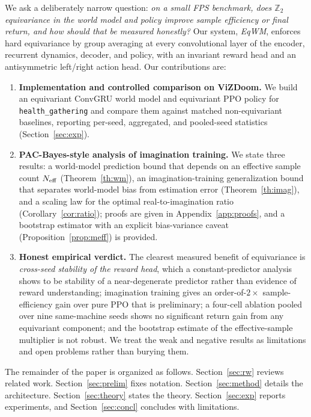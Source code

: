 \documentclass[preprint,12pt]{elsarticle}
\begin{document}
We ask a deliberately narrow question: \emph{on a small FPS benchmark, does
$\mathbb Z_2$ equivariance in the world model and policy improve sample
efficiency or final return, and how should that be measured honestly?} Our
system, \emph{EqWM}, enforces hard equivariance by group averaging
\cite{gcnn2016} at every convolutional layer of the encoder, recurrent
dynamics, decoder, and policy, with an invariant reward head and an
antisymmetric left/right action head. Our contributions are:
\begin{enumerate}[leftmargin=*]
  \item \textbf{Implementation and controlled comparison on ViZDoom.} We
        build an equivariant ConvGRU world model and equivariant PPO policy
        for \texttt{health\_gathering} and compare them against matched
        non-equivariant baselines, reporting per-seed, aggregated, and
        pooled-seed statistics (Section~\ref{sec:exp}).
  \item \textbf{PAC-Bayes-style analysis of imagination training.} We state
        three results: a world-model prediction bound that depends on an
        effective sample count $N_{\rm eff}$ (Theorem~\ref{th:wm}), an
        imagination-training generalization bound that separates world-model
        bias from estimation error (Theorem~\ref{th:imag}), and a scaling law
        for the optimal real-to-imagination ratio
        (Corollary~\ref{cor:ratio}); proofs are given in
        Appendix~\ref{app:proofs}, and a bootstrap estimator with an explicit
        bias-variance caveat (Proposition~\ref{prop:meff}) is provided.
  \item \textbf{Honest empirical verdict.} The clearest measured benefit of
        equivariance is \emph{cross-seed stability of the reward head}, which
        a constant-predictor analysis shows to be stability of a
        near-degenerate predictor rather than evidence of reward
        understanding; imagination training gives an order-of-$2\times$
        sample-efficiency gain over pure PPO that is preliminary; a four-cell
        ablation pooled over nine same-machine seeds shows no significant
        return gain from any equivariant component; and the bootstrap estimate
        of the effective-sample multiplier is not robust. We treat the weak
        and negative results as limitations and open problems rather than
        burying them.
\end{enumerate}

The remainder of the paper is organized as follows. Section~\ref{sec:rw}
reviews related work. Section~\ref{sec:prelim} fixes notation.
Section~\ref{sec:method} details the architecture. Section~\ref{sec:theory}
states the theory. Section~\ref{sec:exp} reports experiments, and
Section~\ref{sec:concl} concludes with limitations.
\end{document}
